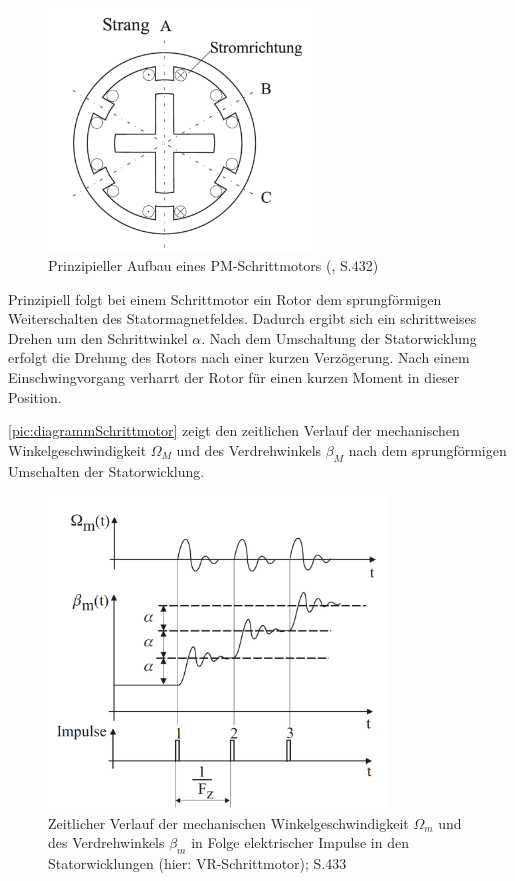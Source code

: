 \begin{figure}[h]
	\begin{center}
		\includegraphics[width=7cm]{pmMotor.png}
		\caption{Prinzipieller Aufbau eines PM-Schrittmotors (\cite{kleinantriebe}, S.432)}
		\label{pic:pmMotor}
	\end{center}
\end{figure}


Prinzipiell folgt bei einem Schrittmotor ein Rotor dem sprungförmigen Weiterschalten des Statormagnetfeldes. Dadurch ergibt sich ein schrittweises Drehen um den Schrittwinkel $\alpha$. Nach dem Umschaltung der Statorwicklung erfolgt die Drehung des Rotors nach einer kurzen Verzögerung. Nach einem Einschwingvorgang verharrt der Rotor für einen kurzen Moment in dieser Position. \newpage

 \autoref{pic:diagrammSchrittmotor} zeigt den zeitlichen Verlauf der mechanischen Winkelgeschwindigkeit  $\Omega_M$ und des Verdrehwinkels $\beta_M$ nach dem sprungförmigen Umschalten der Statorwicklung.  

 
\begin{figure}[h]
	\begin{center}
		\includegraphics[width=9cm]{DiagrammVerlaufSchrittmotor.png}
		\caption{Zeitlicher Verlauf der mechanischen Winkelgeschwindigkeit $\Omega_m$ und des Verdrehwinkels $\beta_m$ in Folge elektrischer Impulse in den Statorwicklungen (hier: VR-Schrittmotor); \cite{kleinantriebe} S.433}
		\label{pic:diagrammSchrittmotor}
	\end{center}
\end{figure}



